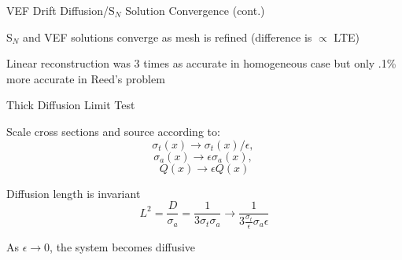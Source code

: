 \documentclass[10pt]{beamer}
\newcommand{\SN}{S$_N$\xspace}
\begin{document}
\begin{frame}{VEF Drift Diffusion/\SN Solution Convergence (cont.)}
	\pause
	\vspace{-.15in}

	\SN and VEF solutions converge as mesh is refined (difference is $\propto$ LTE)

	\pause
	Linear reconstruction was 3 times as accurate in homogeneous case but only .1\% more accurate in Reed's problem 

\end{frame}

\begin{frame}{Thick Diffusion Limit Test}

	Scale cross sections and source according to:
	$$ \sigma_t(x) \rightarrow \sigma_t(x)/\epsilon, \ $$
	$$ \sigma_a(x) \rightarrow \epsilon \sigma_a(x), \ $$
	$$ Q(x) \rightarrow \epsilon Q(x) $$

	Diffusion length is invariant 
	\begin{equation*}
		L^2 = \frac{D}{\sigma_a} = \frac{1}{3\sigma_t\sigma_a} \rightarrow
			\frac{1}{3 \frac{\sigma_t}{\epsilon} \sigma_a \epsilon}
	\end{equation*}

	As $\epsilon \rightarrow 0$, the system becomes diffusive 

\end{frame}
\end{document}
